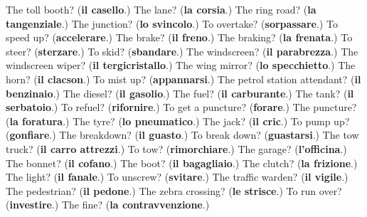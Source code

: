 \begin{tcolorbox}[breakable,colback=teal!4,colframe=teal!35!black,title={Before you move on}]
The toll booth? (\textbf{il casello}.) The lane? (\textbf{la corsia}.) The ring road? (\textbf{la tangenziale}.) The junction? (\textbf{lo svincolo}.) To overtake? (\textbf{sorpassare}.) To speed up? (\textbf{accelerare}.) The brake? (\textbf{il freno}.) The braking? (\textbf{la frenata}.) To steer? (\textbf{sterzare}.) To skid? (\textbf{sbandare}.) The windscreen? (\textbf{il parabrezza}.) The windscreen wiper? (\textbf{il tergicristallo}.) The wing mirror? (\textbf{lo specchietto}.) The horn? (\textbf{il clacson}.) To mist up? (\textbf{appannarsi}.) The petrol station attendant? (\textbf{il benzinaio}.) The diesel? (\textbf{il gasolio}.) The fuel? (\textbf{il carburante}.) The tank? (\textbf{il serbatoio}.) To refuel? (\textbf{rifornire}.) To get a puncture? (\textbf{forare}.) The puncture? (\textbf{la foratura}.) The tyre? (\textbf{lo pneumatico}.) The jack? (\textbf{il cric}.) To pump up? (\textbf{gonfiare}.) The breakdown? (\textbf{il guasto}.) To break down? (\textbf{guastarsi}.) The tow truck? (\textbf{il carro attrezzi}.) To tow? (\textbf{rimorchiare}.) The garage? (\textbf{l'officina}.) The bonnet? (\textbf{il cofano}.) The boot? (\textbf{il bagagliaio}.) The clutch? (\textbf{la frizione}.) The light? (\textbf{il fanale}.) To unscrew? (\textbf{svitare}.) The traffic warden? (\textbf{il vigile}.) The pedestrian? (\textbf{il pedone}.) The zebra crossing? (\textbf{le strisce}.) To run over? (\textbf{investire}.) The fine? (\textbf{la contravvenzione}.)
\end{tcolorbox}

